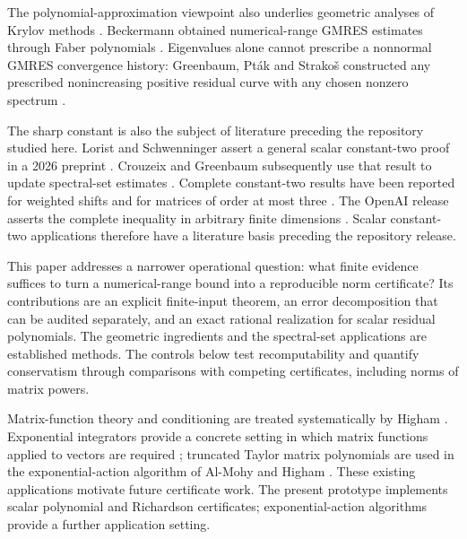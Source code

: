 \documentclass[11pt]{article}
\theoremstyle{definition}
\theoremstyle{remark}
\numberwithin{equation}{section}
\begin{document}
The polynomial-approximation viewpoint also underlies geometric
analyses of Krylov methods \citep{EiermannErnst2001}.
Beckermann obtained numerical-range GMRES estimates through Faber
polynomials \citep{Beckermann2005}. Eigenvalues alone cannot prescribe
a nonnormal GMRES convergence history: Greenbaum, Pt{\'a}k and
Strako{\v s} constructed any prescribed nonincreasing positive residual
curve with any chosen nonzero spectrum
\citep{GreenbaumPtakStrakos1996}.


The sharp constant is also the subject of literature preceding the
repository studied here. Lorist and Schwenninger assert a general scalar
constant-two proof in a 2026 preprint \citep{LoristSchwenninger2026}.
Crouzeix and Greenbaum subsequently use that result to update
spectral-set estimates \citep{CrouzeixGreenbaum2026Update}. Complete
constant-two results have been reported for weighted shifts
\citep{CrouzeixGreenbaum2025} and for matrices of order at most three
\citep{AhagCzyzVirtanen2026}. The OpenAI release asserts the complete
inequality in arbitrary finite dimensions
\citep{OAI:A-direct-proof-of-the-complete-Crouzeix-inequality-September-26-2026}.
Scalar constant-two applications therefore have a literature basis
preceding the repository release.

This paper addresses a narrower operational question: what finite evidence
suffices to turn a numerical-range bound into a reproducible norm
certificate? Its contributions are an explicit finite-input theorem, an
error decomposition that can be audited separately, and an exact rational
realization for scalar residual polynomials. The geometric ingredients and
the spectral-set applications are established methods. The controls below
test recomputability and quantify conservatism through comparisons with
competing certificates, including norms of matrix powers.

Matrix-function theory and conditioning are treated systematically by
Higham \citep{Higham2008}. Exponential integrators provide a concrete
setting in which matrix functions applied to vectors are required
\citep{HochbruckOstermann2010}; truncated Taylor matrix polynomials
are used in the exponential-action algorithm of Al-Mohy and Higham
\citep{AlMohyHigham2011}. These existing applications motivate future
certificate work. The present prototype implements scalar polynomial and
Richardson certificates; exponential-action algorithms provide a further
application setting.
\end{document}
